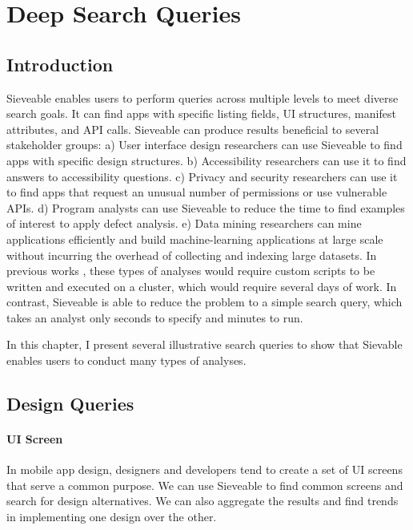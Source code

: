 \chapter{Deep Search Queries}
\label{ch:findings_chapter}

\section{Introduction}
Sieveable enables users to perform queries across multiple levels to meet diverse search goals.
It can find apps with specific listing fields, UI structures, manifest attributes, and API calls.
Sieveable can produce results beneficial to several stakeholder groups:
a) User interface design researchers can use Sieveable to find apps with specific design structures.
b) Accessibility researchers can use it to find answers to accessibility questions.
c) Privacy and security researchers can use it to find apps that request an unusual number of permissions or use vulnerable APIs.
d) Program analysts can use Sieveable to reduce the time to find examples of interest to apply defect analysis.
e) Data mining researchers can mine applications efficiently and build machine-learning applications at large scale without incurring the overhead of collecting and indexing large datasets.
In previous works \cite{Alharbi_2015_MobileHCI}, these types of analyses would require custom scripts to be written and executed on a cluster, which would require several days of work.
In contrast, Sieveable is able to reduce the problem to a simple search query, which takes an analyst only seconds to specify and minutes to run.

In this chapter, I present several illustrative search queries to show that Sievable enables users to conduct many types of analyses.

\section{Design Queries}
\subsubsection{UI Screen}
In mobile app design, designers and developers tend to create a set of UI screens that serve a common purpose. 
We can use Sieveable to find common screens and search for design alternatives.
We can also aggregate the results and find trends in implementing one design over the other.

